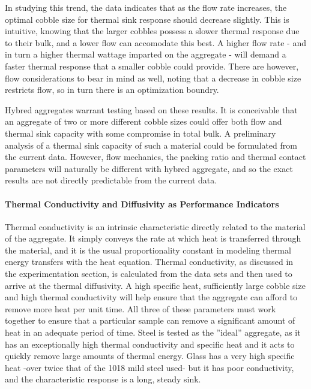 In studying this trend, the data indicates that as the flow rate increases, the optimal cobble size for thermal sink response should decrease slightly. This is intuitive, knowing that the larger cobbles possess a slower thermal response due to their bulk, and a lower flow can accomodate this best. A higher flow rate - and in turn a higher thermal wattage imparted on the aggregate -  will demand a faster thermal response that a smaller cobble could provide. There are however, flow considerations to bear in mind as well, noting that a decrease in cobble size restricts flow, so in turn there is an optimization boundry. 

Hybred aggregates warrant testing based on these results. It is conceivable that an aggregate of two or more different cobble sizes could offer both flow and thermal sink capacity with some compromise in total bulk. A preliminary analysis of a thermal sink capacity of such a material could be formulated from the current data. However, flow mechanics, the packing ratio and thermal contact parameters will naturally be different with hybred aggregate, and so the exact results are not directly predictable from the current data.

\paragraph{Thermal Conductivity and Diffusivity as Performance Indicators}
Thermal conductivity is an intrinsic characteristic directly related to the material of the aggregate. It simply conveys the rate at which heat is transferred through the material, and it is the usual proportionality constant in modeling thermal energy transfers with the heat equation. Thermal conductivity, as discussed in the experimentation section, is calculated from the data sets and then used to arrive at the thermal diffusivity. A high specific heat, sufficiently large cobble size and high thermal conductivity will help ensure that the aggregate can afford to remove more heat per unit time. All three of these parameters must work together to ensure that a particular sample can remove a significant amount of heat in an adequate period of time. Steel is tested as the ''ideal'' aggregate, as it has an exceptionally high thermal conductivity and specific heat and it acts to quickly remove large amounts of thermal energy. Glass has a very high specific heat -over twice that of the 1018 mild steel used- but it has poor conductivity, and the characteristic response is a long, steady sink. 

